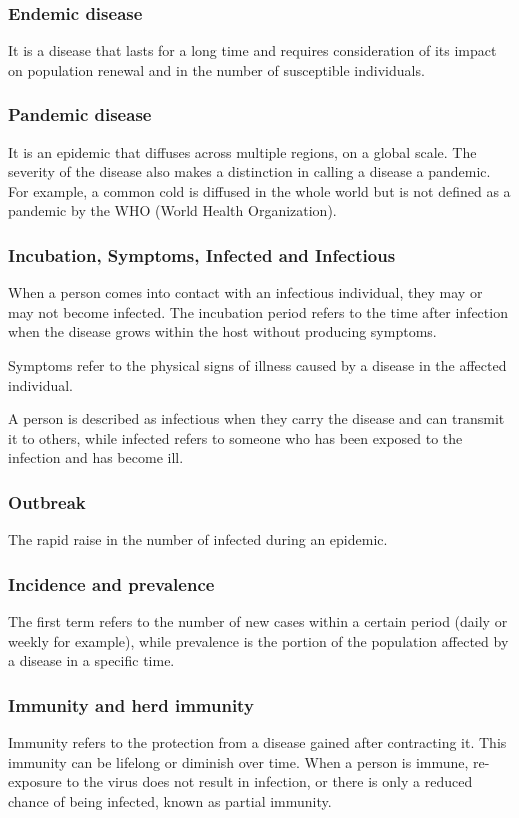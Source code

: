 \subsubsection{Endemic disease} It is a disease that lasts for a long time and requires consideration of its impact on population renewal and in the number of susceptible individuals.

\subsubsection{Pandemic disease} It is an epidemic that diffuses across multiple regions, on a global scale. The severity of the disease also makes a distinction in calling a disease a pandemic. For example, a common cold is diffused in the whole world but is not defined as a pandemic by the WHO (World Health Organization). 

\subsubsection{Incubation, Symptoms, Infected and Infectious}  When a person comes into contact with an infectious individual, they may or may not become infected. The incubation period refers to the time after infection when the disease grows within the host without producing symptoms.

Symptoms refer to the physical signs of illness caused by a disease in the affected individual.

A person is described as infectious when they carry the disease and can transmit it to others, while infected refers to someone who has been exposed to the infection and has become ill.


\subsubsection{Outbreak} The rapid raise in the number of infected during an epidemic.

\subsubsection{Incidence and prevalence} The first term refers to the number of new cases within a certain period (daily or weekly for example), while prevalence is the portion of the population affected by a disease in a specific time.

\subsubsection{Immunity and herd immunity}
Immunity refers to the protection from a disease gained after contracting it. This immunity can be lifelong or diminish over time. When a person is immune, re-exposure to the virus does not result in infection, or there is only a reduced chance of being infected, known as partial immunity.

